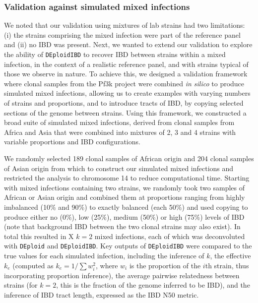 \documentclass[9pt,lineno]{elife}
\begin{document}
\subsubsection{Validation against simulated mixed infections}

We noted that our validation using mixtures of lab strains had two limitations: (i) the strains comprising the mixed infection were part of  the reference panel and (ii) no IBD was present.  Next, we wanted to extend our validation to explore the ability of \texttt{DEploidIBD} to recover IBD between strains within a mixed infection, in the context of a realistic reference panel, and with strains typical of those we observe in nature.  To achieve this, we designed a validation framework where clonal samples from the Pf3k project were combined {\it in silico } to produce simulated mixed infections, allowing us to create examples with varying numbers of strains and proportions, and to introduce tracts of IBD, by copying selected sections of the genome between strains. Using this framework, we constructed a broad suite of simulated mixed infections, derived from clonal samples from Africa and Asia that were combined into mixtures of 2, 3 and 4 strains with variable proportions and IBD configurations.

We randomly selected 189 clonal samples of African origin and 204 clonal samples of Asian origin from which to construct our simulated mixed infections and restricted the analysis to chromosome 14 to reduce computational time. Starting with mixed infections containing two strains, we randomly took two samples of African or Asian origin and combined them at proportions ranging from highly imbalanced (10\% and 90\%) to exactly balanced (each 50\%) and used copying to produce either no (0\%), low (25\%), medium (50\%) or high (75\%) levels of IBD (note that background IBD between the two clonal strains may also exist). In total this resulted in X $k=2$ mixed infections, each of which was deconvoluted with \texttt{DEploid} and \texttt{DEploidIBD}. Key outputs of \texttt{DEploidIBD} were compared to the true values for each simulated infection, including the inference of $k$, the effective $k_e$ (computed as $k_e = 1/\sum w_{i}^{2}$, where $w_i$ is the proportion of the $i$th strain, thus incorporating proportion inference), the average pairwise relatedness between strains (for $k=2$, this is the fraction of the genome inferred to be IBD), and the inference of IBD tract length, expressed as the IBD N50 metric.
\end{document}
